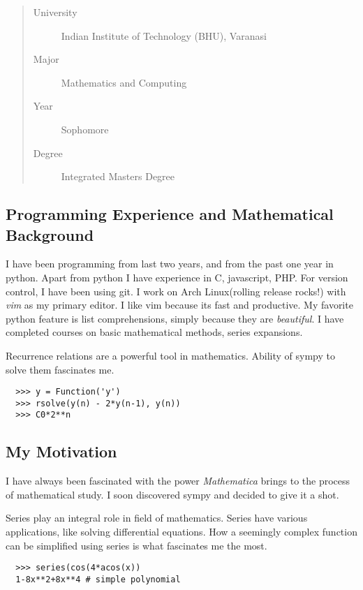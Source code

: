 \documentclass[a4paper,12pt]{article}
\begin{document}
\begin{quote}
  \begin{description}
    \item [University] {Indian Institute of Technology (BHU), Varanasi}
    \item [Major] {Mathematics and Computing}
    \item [Year] {Sophomore}
    \item [Degree] {Integrated Masters Degree}
  \end{description}
\end{quote}

\subsection*{Programming Experience and Mathematical Background}

I have been programming from last two years, and from the past one year in python.
Apart from python I have experience in C, javascript, PHP. For version control, I have been using git.
I work on Arch Linux(rolling release rocks!) with \textit{vim} as my primary editor. I like vim because its fast and productive.
My favorite python feature is list comprehensions, simply because they are \textit{beautiful}.
I have completed courses on basic mathematical methods, series expansions. 

Recurrence relations are a powerful tool in mathematics. Ability of sympy to solve them fascinates me.

\begin{verbatim}
  >>> y = Function('y')
  >>> rsolve(y(n) - 2*y(n-1), y(n))
  >>> C0*2**n
\end{verbatim}

\subsection*{My Motivation}

I have always been fascinated with the power \textit{Mathematica}
\cite{mathematica} brings to the process of mathematical study. I soon discovered sympy and decided to give it a shot.

Series play an integral role in field of mathematics. Series have various applications, like solving differential equations.
How a seemingly complex function can be simplified using series is what fascinates me the most.

\begin{verbatim}
  >>> series(cos(4*acos(x))
  1-8x**2+8x**4 # simple polynomial
\end{verbatim}
\end{document}
